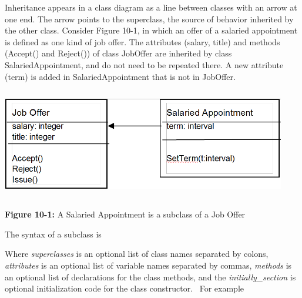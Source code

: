 Inheritance appears in a class diagram as a line between classes with an
arrow at one end. The arrow points to the superclass, the source of
behavior inherited by the other class. Consider Figure 10-1, in which
an offer of a salaried appointment is defined as one kind of job offer.
The attributes (\textsf{salary}, \textsf{title}) and methods
(\textsf{Accept()} and \textsf{Reject()}) of class JobOffer are
inherited by class SalariedAppointment, and do not need to be repeated
there. A new attribute (term) is added in \textsf{SalariedAppointment}
that is not in \textsf{JobOffer}.

\bigskip

\includegraphics[width=4.9in,height=1.9in]{ub-img/subclass.png} 

{\sffamily\bfseries Figure 10-1:}
{\sffamily A Salaried Appointment is a subclass of a Job Offer}

\bigskip

The syntax of a subclass is 


Where \textsf{\textit{superclasses}} is an optional list of class names
separated by colons, \textsf{\textit{attributes}} is an optional list
of variable names separated by commas,
\textsf{\textit{methods}} is an optional list of declarations for the
class methods, and the \textsf{\textit{initially\_section}} is optional
initialization code for the class constructor. \ For
example


